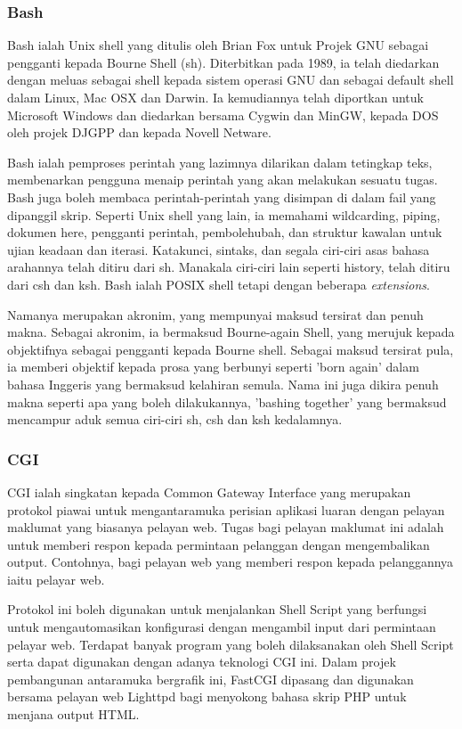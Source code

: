 \subsubsection{Bash}
Bash ialah Unix shell yang ditulis oleh Brian Fox untuk Projek GNU sebagai pengganti kepada Bourne Shell (sh). Diterbitkan pada 1989, ia telah diedarkan dengan meluas sebagai shell kepada sistem operasi GNU dan sebagai default shell dalam Linux, Mac OSX dan Darwin. Ia kemudiannya telah diportkan untuk Microsoft Windows dan diedarkan bersama Cygwin dan MinGW, kepada DOS oleh projek DJGPP dan kepada Novell Netware.

Bash ialah pemproses perintah yang lazimnya dilarikan dalam tetingkap teks, membenarkan pengguna menaip perintah yang akan melakukan sesuatu tugas. Bash juga boleh membaca perintah-perintah yang disimpan di dalam fail yang dipanggil skrip. Seperti Unix shell yang lain, ia memahami wildcarding, piping, dokumen here, pengganti perintah, pembolehubah, dan struktur kawalan untuk ujian keadaan dan iterasi. Katakunci, sintaks, dan segala ciri-ciri asas bahasa arahannya telah ditiru dari sh. Manakala ciri-ciri lain seperti history, telah ditiru dari csh dan ksh. Bash ialah POSIX shell tetapi dengan beberapa \textit{extensions}.

Namanya merupakan akronim, yang mempunyai maksud tersirat dan penuh makna. Sebagai akronim, ia bermaksud Bourne-again Shell, yang merujuk kepada objektifnya sebagai pengganti kepada Bourne shell. Sebagai maksud tersirat pula, ia memberi objektif kepada prosa yang berbunyi seperti 'born again' dalam bahasa Inggeris yang bermaksud kelahiran semula. Nama ini juga dikira penuh makna seperti apa yang boleh dilakukannya, 'bashing together' yang bermaksud mencampur aduk semua ciri-ciri sh, csh dan ksh kedalamnya. 

\subsubsection{CGI}
CGI ialah singkatan kepada Common Gateway Interface yang merupakan protokol piawai untuk mengantaramuka perisian aplikasi luaran dengan pelayan maklumat yang biasanya pelayan web. Tugas bagi pelayan maklumat ini adalah untuk memberi respon kepada permintaan pelanggan dengan mengembalikan output. Contohnya, bagi pelayan web yang memberi respon kepada pelanggannya iaitu pelayar web.

Protokol ini boleh digunakan untuk menjalankan Shell Script yang berfungsi untuk mengautomasikan konfigurasi dengan mengambil input dari permintaan pelayar web. Terdapat banyak program yang boleh dilaksanakan oleh Shell Script serta dapat digunakan dengan adanya teknologi CGI ini. Dalam projek pembangunan antaramuka bergrafik ini, FastCGI dipasang dan digunakan bersama pelayan web Lighttpd bagi menyokong bahasa skrip PHP untuk menjana output \ac{HTML}.

